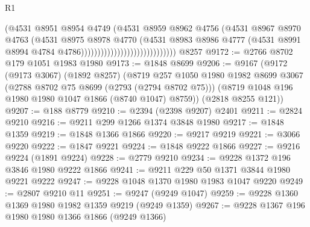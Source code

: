 \begin{lexlean}{R1}
\begin{coremodule}
                                                  (@4531
                                                    @8951
                                                    @8954
                                                    @4749
                                                    (@4531
                                                      @8959
                                                      @8962
                                                      @4756
                                                      (@4531
                                                        @8967
                                                        @8970
                                                        @4763
                                                        (@4531
                                                          @8975
                                                          @8978
                                                          @4770
                                                          (@4531
                                                            @8983
                                                            @8986
                                                            @4777
                                                            (@4531
                                                              @8991
                                                              @8994
                                                              @4784
                                                              @4786)))))))))))))))))))))))))))))
    @8257
@9172 := @2766 @8702 @179 @1051 @1983 @1980
@9173 := @1848 @8699
@9206 := @9167
    (@9172
      (@9173 @3067)
      (@1892 @8257)
      (@8719
        @257
        @1050
        @1980
        @1982
        @8699
        @3067
        (@2788 @8702 @75 @8699 (@2793 (@2794 @8702 @75)))
        (@8719 @1048 @196 @1980 @1980 @1047 @1866 (@8740 @1047) @8759))
      (@2818 @8255 @121))
@9207 := @188 @8779
@9210 := @2394 (@2398 @9207) @2401
@9211 := @2824 @9210
@9216 := @9211 @299 @1266 @1374 @3848 @1980
@9217 := @1848 @1359
@9219 := @1848 @1366 @1866
@9220 := @9217 @9219
@9221 := @3066 @9220
@9222 := @1847 @9221
@9224 := @1848 @9222 @1866
@9227 := @9216 @9224 (@1891 @9224)
@9228 := @2779 @9210
@9234 := @9228 @1372 @196 @3846 @1980 @9222 @1866
@9241 := @9211 @229 @50 @1371 @3844 @1980 @9221 @9222
@9247 := @9228 @1048 @1370 @1980 @1983 @1047 @9220
@9249 := @2807 @9210 @11
@9251 := @9247 (@9249 @1047)
@9259 := @9228 @1360 @1369 @1980 @1982 @1359 @9219 (@9249 @1359)
@9267 := @9228 @1367 @196 @1980 @1980 @1366 @1866 (@9249 @1366)

\end{coremodule}
\end{lexlean}
